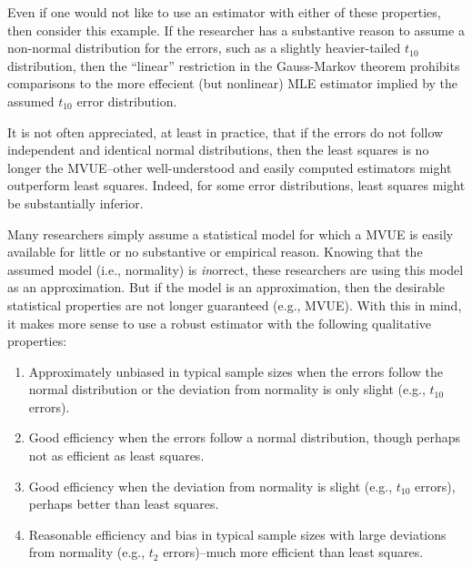 \documentclass[12pt]{article}
\begin{document}
Even if one would not like to use an estimator with either of these properties, then consider this example. If the researcher has a substantive reason to assume a non-normal distribution for the errors, such as a slightly heavier-tailed $t_{10}$ distribution, then the ``linear'' restriction in the Gauss-Markov theorem prohibits comparisons to the more effecient (but nonlinear) MLE estimator implied by the assumed $t_{10}$ error distribution.

It is not often appreciated, at least in practice, that if the errors do not follow independent and identical normal distributions, then the least squares is no longer the MVUE--other well-understood and easily computed estimators might outperform least squares. Indeed, for some error distributions, least squares might be substantially inferior.

Many researchers simply assume a statistical model for which a MVUE is easily available for little or no substantive or empirical reason. Knowing that the assumed model (i.e., normality) is \textit{in}orrect, these researchers are using this model as an approximation. But if the model is an approximation, then the desirable statistical properties are not longer guaranteed (e.g., MVUE). With this in mind, it makes more sense to use a robust estimator with the following qualitative properties:
\begin{enumerate}
\item Approximately unbiased in typical sample sizes when the errors follow the normal distribution or the deviation from normality is only slight (e.g., $t_10$ errors).
\item Good efficiency when the errors follow a normal distribution, though perhaps not as efficient as least squares.
\item Good efficiency when the deviation from normality is slight (e.g., $t_10$ errors), perhaps better than least squares.
\item Reasonable efficiency and bias in typical sample sizes with large deviations from normality (e.g., $t_2$ errors)--much more efficient than least squares.
\end{enumerate}

\end{document}
